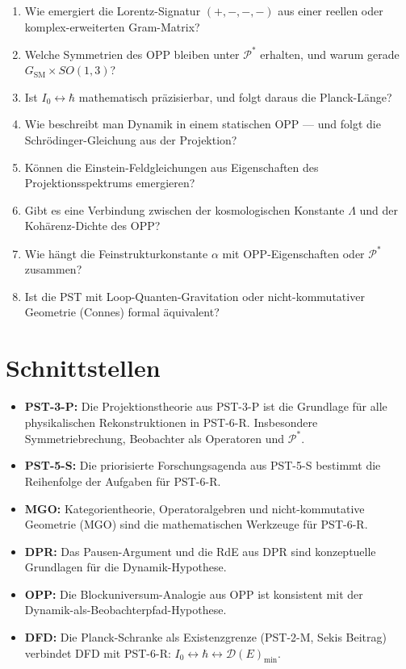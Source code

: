 \documentclass[11pt,a4paper]{article}
\theoremstyle{plain}
\theoremstyle{definition}
\newcommand{\Proj}{\mathcal{P}}
\begin{document}
\begin{enumerate}
  \item Wie emergiert die Lorentz-Signatur $(+,-,-,-)$ aus einer
        reellen oder komplex-erweiterten Gram-Matrix?
  \item Welche Symmetrien des OPP bleiben unter $\Proj^\ast$ erhalten,
        und warum gerade $G_{\text{SM}} \times SO(1,3)$?
  \item Ist $I_0 \leftrightarrow \hbar$ mathematisch pr\"{a}zisierbar,
        und folgt daraus die Planck-L\"{a}nge?
  \item Wie beschreibt man Dynamik in einem statischen OPP ---
        und folgt die Schr\"{o}dinger-Gleichung aus der Projektion?
  \item K\"{o}nnen die Einstein-Feldgleichungen aus Eigenschaften des
        Projektionsspektrums emergieren?
  \item Gibt es eine Verbindung zwischen der kosmologischen Konstante
        $\Lambda$ und der Koh\"{a}renz-Dichte des OPP?
  \item Wie h\"{a}ngt die Feinstrukturkonstante $\alpha$ mit
        OPP-Eigenschaften oder $\Proj^\ast$ zusammen?
  \item Ist die PST mit Loop-Quanten-Gravitation oder
        nicht-kommutativer Geometrie (Connes) formal \"{a}quivalent?
\end{enumerate}

\section{Schnittstellen}

\begin{itemize}
  \item \textbf{PST-3-P:} Die Projektionstheorie aus PST-3-P ist die
        Grundlage f\"{u}r alle physikalischen Rekonstruktionen in PST-6-R.
        Insbesondere Symmetriebrechung, Beobachter als Operatoren und
        $\Proj^\ast$.
  \item \textbf{PST-5-S:} Die priorisierte Forschungsagenda aus PST-5-S
        bestimmt die Reihenfolge der Aufgaben f\"{u}r PST-6-R.
  \item \textbf{MGO:} Kategorientheorie, Operatoralgebren und
        nicht-kommutative Geometrie (MGO) sind die mathematischen
        Werkzeuge f\"{u}r PST-6-R.
  \item \textbf{DPR:} Das Pausen-Argument und die RdE aus DPR sind
        konzeptuelle Grundlagen f\"{u}r die Dynamik-Hypothese.
  \item \textbf{OPP:} Die Blockuniversum-Analogie aus OPP ist
        konsistent mit der Dynamik-als-Beobachterpfad-Hypothese.
  \item \textbf{DFD:} Die Planck-Schranke als Existenzgrenze
        (PST-2-M, Sekis Beitrag) verbindet DFD mit PST-6-R:
        $I_0 \leftrightarrow \hbar \leftrightarrow \mathcal{D}(E)_{\min}$.
\end{itemize}
\end{document}
